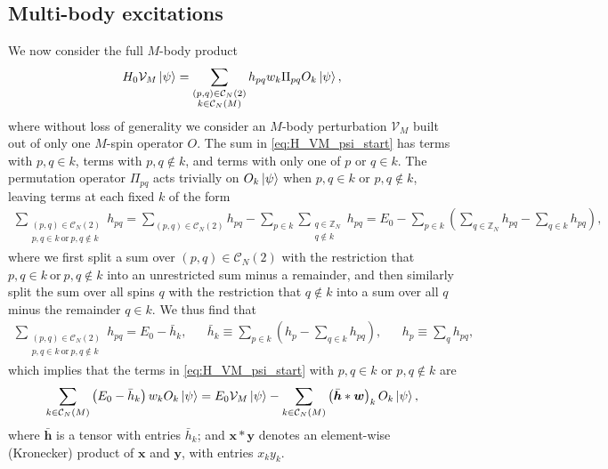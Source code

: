 \documentclass[nofootinbib,notitlepage,11pt]{revtex4-2}
\renewcommand{\t}{\text} %
\newcommand{\p}[1]{\left(#1\right)} %
\newcommand{\m}{\bm} %
\newcommand{\1}{\mathds{1}}
\newcommand{\C}{\mathcal{C}}
\newcommand{\V}{\mathcal{V}}
\newcommand{\ZZ}{\mathbb{Z}}
\begin{document}


\subsection{Multi-body excitations}
\label{sec:H_VM_psi}

We now consider the full $M$-body product
\begin{align}
  H_0 \V_M \ket\psi
  = \sum_{\substack{\p{p,q}\in\C_N\p{2}\\k\in\C_N\p{M}}} h_{pq} w_k
  \Pi_{pq} O_k \ket\psi,
  \label{eq:H_VM_psi_start}
\end{align}
where without loss of generality we consider an $M$-body perturbation
$\V_M$ built out of only one $M$-spin operator $O$.  The sum in
\eqref{eq:H_VM_psi_start} has terms with $p,q\in k$, terms with
$p,q\notin k$, and terms with only one of $p$ or $q\in k$.  The
permutation operator $\Pi_{pq}$ acts trivially on $O_k\ket\psi$ when
$p,q\in k$ or $p,q\notin k$, leaving terms at each fixed $k$ of the
form
\begin{align}
  \sum_{\substack{\p{p,q}\in\C_N\p{2}\\p,q\in k~\t{or}~p,q\notin k}} h_{pq}
  = \sum_{\p{p,q}\in\C_N\p{2}} h_{pq}
  - \sum_{p\in k} \sum_{\substack{q\in\ZZ_N\\q\notin k}} h_{pq}
  = E_0 - \sum_{p\in k}
  \p{\sum_{q\in\ZZ_N} h_{pq} - \sum_{q\in k} h_{pq}},
\end{align}
where we first split a sum over $\p{p,q}\in\C_N\p{2}$ with the
restriction that $p,q\in k~\t{or}~p,q\notin k$ into an unrestricted
sum minus a remainder, and then similarly split the sum over all spins
$q$ with the restriction that $q\notin k$ into a sum over all $q$
minus the remainder $q\in k$.  We thus find that
\begin{align}
  \sum_{\substack{\p{p,q}\in\C_N\p{2}\\p,q\in k~\t{or}~p,q\notin k}} h_{pq}
  = E_0 - \bar h_k,
  &&
  \bar h_k \equiv \sum_{p\in k}\p{h_p - \sum_{q\in k}h_{pq}},
  &&
  h_p \equiv \sum_q h_{pq},
\end{align}
which implies that the terms in \eqref{eq:H_VM_psi_start} with
$p,q\in k$ or $p,q\notin k$ are
\begin{align}
  \sum_{k\in\C_N\p{M}} \p{E_0 - \bar h_k} w_k O_k \ket\psi
  = E_0 \V_M \ket\psi
  - \sum_{k\in\C_N\p{M}} \p{\bar{\m h} * \m w}_k O_k \ket\psi,
\end{align}
where $\bar{\m h}$ is a tensor with entries $\bar h_k$; and
$\m x*\m y$ denotes an element-wise (Kronecker) product of $\m x$ and
$\m y$, with entries $x_ky_k$.
\end{document}

